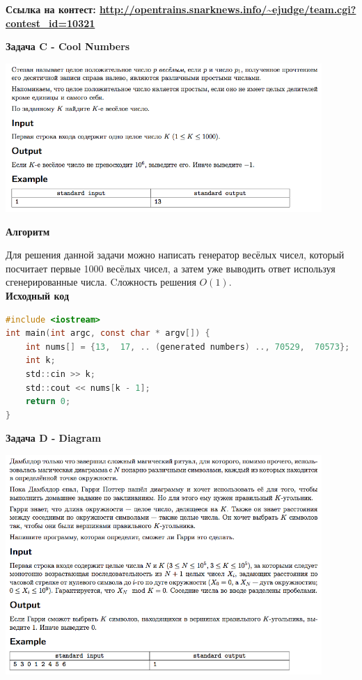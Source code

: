 \documentclass[a4paper,12pt]{article}
\begin{document}
\textbf{{\large Ссылка на контест: \url{http://opentrains.snarknews.info/~ejudge/team.cgi?contest_id=10321}}}

\newpage
\textbf{{\large Задача C - Cool Numbers}}

\begin{center}
\includegraphics[width=0.9\textwidth]{OC_Ukraine/C.png}\\ [1cm]
\end{center}

\textbf{{\large Алгоритм}}

Для решения данной задачи можно написать генератор весёлых чисел, который посчитает первые 1000 весёлых чисел, а затем уже выводить ответ используя сгенерированные числа. Cложность решения $O(1)$. \\

\textbf{{\large Исходный код}} \\
\begin{lstlisting}[language=C]
#include <iostream>
int main(int argc, const char * argv[]) {
    int nums[] = {13,  17, .. (generated numbers) .., 70529,  70573};
    int k;
    std::cin >> k;
    std::cout << nums[k - 1];
    return 0;
}
\end{lstlisting}


\newpage
\textbf{{\large Задача D - Diagram}}

\begin{center}
\includegraphics[width=0.9\textwidth]{OC_Ukraine/D.png}\\ [1cm]
\end{center}
\end{document}
